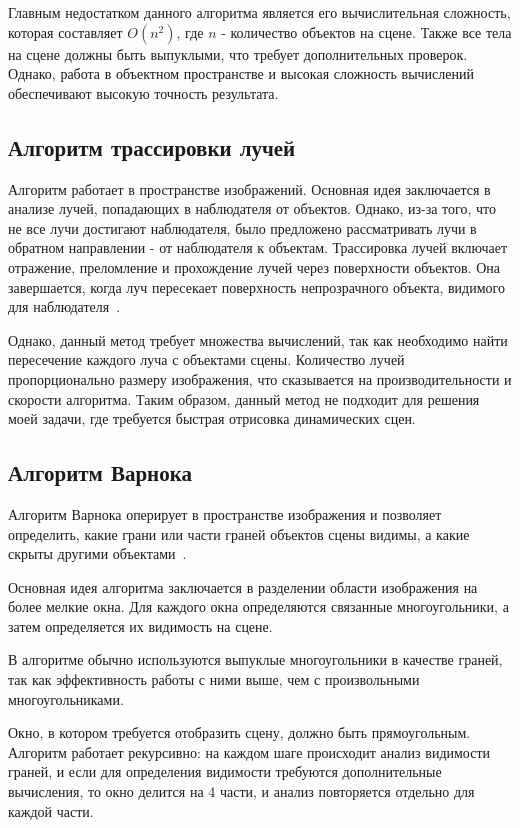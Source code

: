 Главным недостатком данного алгоритма является его вычислительная сложность, которая составляет $O(n^2)$, где $n$ - количество объектов на сцене. Также все тела на сцене должны быть выпуклыми, что требует дополнительных проверок. Однако, работа в объектном пространстве и высокая сложность вычислений обеспечивают высокую точность результата.


\subsection{Алгоритм трассировки лучей}

Алгоритм работает в пространстве изображений. Основная идея заключается в анализе лучей, попадающих в наблюдателя от объектов. Однако, из-за того, что не все лучи достигают наблюдателя, было предложено рассматривать лучи в обратном направлении - от наблюдателя к объектам. Трассировка лучей включает отражение, преломление и прохождение лучей через поверхности объектов. Она завершается, когда луч пересекает поверхность непрозрачного объекта, видимого для наблюдателя~\cite{roders}.

Однако, данный метод требует множества вычислений, так как необходимо найти пересечение каждого луча с объектами сцены. Количество лучей пропорционально размеру изображения, что сказывается на производительности и скорости алгоритма. Таким образом, данный метод не подходит для решения моей задачи, где требуется быстрая отрисовка динамических сцен.

\subsection{Алгоритм Варнока}

Алгоритм Варнока оперирует в пространстве изображения и позволяет определить, какие грани или части граней объектов сцены видимы, а какие скрыты другими объектами~\cite{roders}.

Основная идея алгоритма заключается в разделении области изображения на более мелкие окна. Для каждого окна определяются связанные многоугольники, а затем определяется их видимость на сцене.

В алгоритме обычно используются выпуклые многоугольники в качестве граней, так как эффективность работы с ними выше, чем с произвольными многоугольниками.

Окно, в котором требуется отобразить сцену, должно быть прямоугольным. Алгоритм работает рекурсивно: на каждом шаге происходит анализ видимости граней, и если для определения видимости требуются дополнительные вычисления, то окно делится на 4 части, и анализ повторяется отдельно для каждой части.


